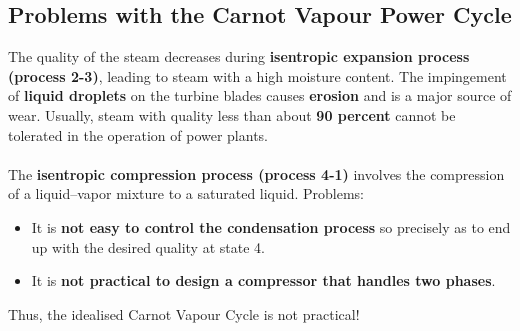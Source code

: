 \subsection{Problems with the Carnot Vapour Power Cycle}
The quality of the steam decreases during \textbf{isentropic expansion process (process 2-3)}, leading to steam with a high moisture content. The impingement of \textbf{liquid droplets} on the turbine blades causes \textbf{erosion} and is a major source of wear. Usually, steam with quality less than about \textbf{90 percent} cannot be tolerated in the operation of power plants. \\\\
The \textbf{isentropic compression process (process 4-1)} involves the compression of a liquid–vapor mixture to a saturated liquid. Problems:
\begin{itemize}[noitemsep]
  \item It is \textbf{not easy to control the condensation process} so precisely as to end up with the desired quality at state 4.
  \item It is \textbf{not practical to design a compressor that handles two phases}.
\end{itemize}
Thus, the idealised Carnot Vapour Cycle is not practical!
